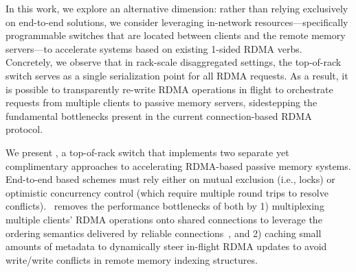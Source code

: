 
In this work, we explore an alternative dimension: rather than relying
exclusively on end-to-end solutions, we consider leveraging in-network
resources---specifically programmable switches that are located between
clients and the remote memory servers---to accelerate systems based on
existing 1-sided RDMA verbs.  Concretely, we observe that in
rack-scale disaggregated settings, the top-of-rack switch serves as a
single serialization point for all RDMA requests.  As a result, it is
possible to transparently re-write RDMA operations in flight to
orchestrate requests from multiple clients to passive memory servers,
sidestepping the fundamental bottlenecks present in the current
connection-based RDMA protocol.



We present \sword, a top-of-rack switch that implements two separate
yet complimentary approaches to accelerating RDMA-based passive memory
systems.  End-to-end based schemes must rely either on mutual
exclusion (i.e., locks) or optimistic concurrency control (which
require multiple round trips to resolve conflicts).  \sword\ removes
the performance bottlenecks of both by 1) multiplexing multiple
clients' RDMA operations onto shared connections to leverage the
ordering semantics delivered by reliable connections~\cite{flock}, and
2) caching small amounts of metadata to dynamically steer in-flight
RDMA updates to avoid write/write conflicts in remote memory indexing structures.


